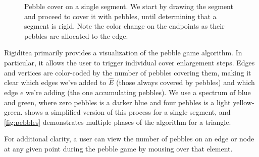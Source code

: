 \documentclass[aps,prd,final,twocolumn,letterpaper,nofootinbib]{revtex4-1}
\begin{document}
\begin{figure}[h]
   \caption{Pebble cover on a single segment.
   We start by drawing the segment
   and proceed to cover it with pebbles,
   until determining that a segment is rigid.
   Note the color change on the endpoints
   as their pebbles are allocated to the edge.}
   \label{fig:seg}
\end{figure}

Rigiditea primarily provides a visualization of the pebble game algorithm.
In particular, it allows the user to trigger individual cover enlargement steps.
Edges and vertices are color-coded by the number of pebbles covering them,
making it clear which edges we've added to $\hat E$
(those always covered by pebbles)
and which edge $e$ we're adding
(the one accumulating pebbles).
We use a spectrum of blue and green,
where zero pebbles is a darker blue and four pebbles is a light yellow-green.
 shows a simplified version of this process for a single segment,
and \cref{fig:pebbles} demonstrates multiple phases of the algorithm
for a triangle.

For additional clarity,
a user can view the number of pebbles on an edge or node
at any given point during the pebble game
by mousing over that element.
\end{document}
